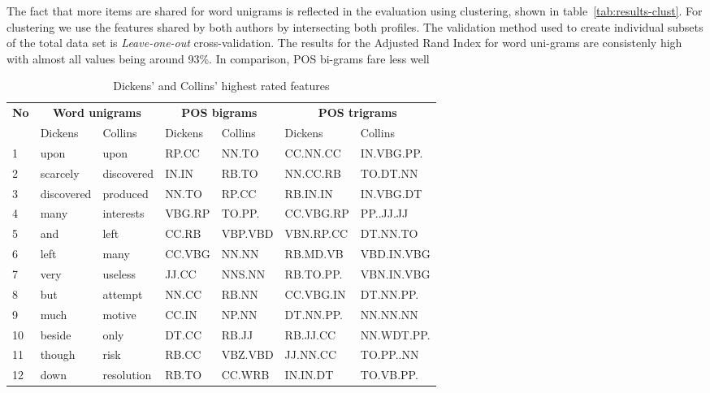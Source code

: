 \documentclass[a4paper,10pt,twoside,fleqn]{article}
\begin{document}
The fact that more items are shared for word unigrams is reflected in the evaluation using 
clustering, shown in table~\ref{tab:results-clust}.
For clustering we use the features shared by both authors by intersecting both profiles. 
The validation method used to create individual subsets of the total data set 
is \emph{Leave-one-out} cross-validation. 
The results for the Adjusted Rand Index for word uni-grams are consistenly high with 
almost all values being around 93\%. In comparison, POS bi-grams fare less well


\begin{table}[h!]
\small
\label{tab:results-features-dc}
\caption{Dickens' and Collins' highest rated features }
\begin{tabular}{lllllll}\toprule[1.2pt]
 \multicolumn{1}{c}{\textbf{No}} & \multicolumn{2}{c}{\textbf{Word unigrams}}&  
 \multicolumn{2}{c}{\textbf{POS bigrams}} & \multicolumn{2}{c}{\textbf{POS trigrams}}\\
 \cmidrule(r){1-1} 
 \cmidrule(r){2-3} 
\cmidrule(r){4-5} 
 \cmidrule(r){6-7}
    & Dickens	  &  Collins    & Dickens&  Collins& Dickens	  &  Collins   \\\midrule
1   &       upon  &       upon  &  RP.CC  &   NN.TO  &  CC.NN.CC   & IN.VBG.PP. \\
2   &   scarcely  & discovered  &  IN.IN  &   RB.TO  &  NN.CC.RB   &   TO.DT.NN  \\
3   & discovered  &   produced  &  NN.TO  &   RP.CC  &  RB.IN.IN   &  IN.VBG.DT \\
4   &       many  &  interests  & VBG.RP  &  TO.PP.  & CC.VBG.RP   &  PP..JJ.JJ \\
5   &        and  &       left  &  CC.RB  & VBP.VBD  & VBN.RP.CC   &   DT.NN.TO \\
6   &       left  &       many  & CC.VBG  &   NN.NN  &  RB.MD.VB   & VBD.IN.VBG \\
7   &       very  &    useless  &  JJ.CC  &  NNS.NN  & RB.TO.PP.   & VBN.IN.VBG \\
8   &        but  &    attempt  &  NN.CC  &   RB.NN  & CC.VBG.IN   &  DT.NN.PP. \\
9   &       much  &     motive  &  CC.IN  &   NP.NN  & DT.NN.PP.   &   NN.NN.NN \\
10  &     beside  &       only  &  DT.CC  &   RB.JJ  &  RB.JJ.CC   & NN.WDT.PP. \\
11  &     though  &       risk  &  RB.CC  & VBZ.VBD  &  JJ.NN.CC   &  TO.PP..NN \\
12  &       down  & resolution  &  RB.TO  &  CC.WRB  &  IN.IN.DT   &  TO.VB.PP. \\

\end{tabular}
\end{table}
\end{document}
